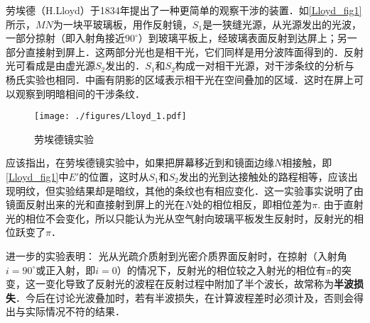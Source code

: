 

劳埃德（H.Lloyd）于1834年提出了一种更简单的观察干涉的装置．如\autoref{Lloyd_fig1}所示，$MN $为一块平玻璃板，用作反射镜，$S_1$是一狭缝光源，从光源发出的光波，一部分掠射（即入射角接近$90^\circ$）到玻璃平板上，经玻璃表面反射到达屏上；另一部分直接射到屏上．这两部分光也是相干光，它们同样是用分波阵面得到的．反射光可看成是由虚光源$S_2 $发出的．$S_1$和$S_2 $构成一对相干光源，对干涉条纹的分析与杨氏实验也相同．中画有阴影的区域表示相干光在空间叠加的区域．这时在屏上可以观察到明暗相间的干涉条纹．
\begin{figure}[ht]
\centering
\texttt{[image: ./figures/Lloyd\_1.pdf]}
\caption{劳埃德镜实验} \label{Lloyd_fig1}
\end{figure}
应该指出，在劳埃德镜实验中，如果把屏幕移近到和镜面边缘$N $相接触，即\autoref{Lloyd_fig1}中$E' $的位置，这时从$S_1$和$S_2$发出的光到达接触处的路程相等，应该出现明纹，但实验结果却是暗纹，其他的条纹也有相应变化．这一实验事实说明了由镜面反射出来的光和直接射到屏上的光在$N $处的相位相反，即相位差为$\pi$. 由于直射光的相位不会变化，所以只能认为光从空气射向玻璃平板发生反射时，反射光的相位跃变了$\pi$．

进一步的实验表明： 光从光疏介质射到光密介质界面反射时，在掠射（入射角$i=90^\circ$或正入射，即$i = 0$）的情况下，反射光的相位较之入射光的相位有$\pi$的突变，这一变化导致了反射光的波程在反射过程中附加了半个波长，故常称为\textbf{半波损失}．今后在讨论光波叠加时，若有半波损失，在计算波程差时必须计及，否则会得出与实际情况不符的结果．